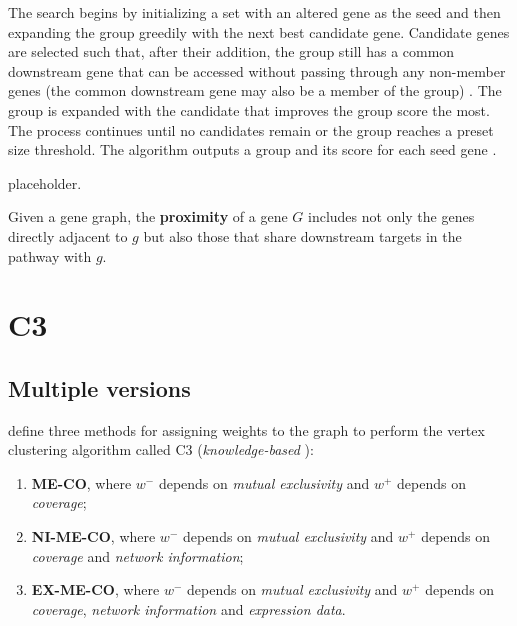 The search begins by initializing a set with an altered gene as the seed and then expanding the group greedily with the next best candidate gene. Candidate genes are selected such that, after their addition, the group still has a common downstream gene that can be accessed without passing through any non-member genes (the common downstream gene may also be a member of the group) . The group is expanded with the candidate that improves the group score the most. The process continues until no candidates remain or the group reaches a preset size threshold. The algorithm outputs a group and its score for each seed gene .

placeholder. 

\begin{definition}[Proximity]
    Given a gene graph, the \textbf{proximity} of a gene $G$ includes not only the genes directly adjacent to $g$ but also those that share downstream targets in the pathway with $g$. 
\end{definition}

\section{C3}

\subsection{Multiple versions}

\textcite{c3} define three methods for assigning weights to the graph to perform the vertex clustering algorithm called C3 (\textit{knowledge-based} \cite{survey}):

\begin{enumerate}
    \item \textbf{ME-CO}, where $w^-$ depends on \textit{mutual exclusivity} and $w^+$ depends on \textit{coverage};
    \item \textbf{NI-ME-CO}, where $w^-$ depends on \textit{mutual exclusivity} and $w^+$ depends on \textit{coverage} and \textit{network information};
    \item \textbf{EX-ME-CO}, where $w^-$ depends on \textit{mutual exclusivity} and $w^+$ depends on \textit{coverage}, \textit{network information} and \textit{expression data}.
\end{enumerate}

